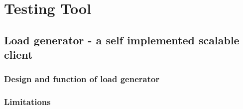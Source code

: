 \chapter{Testing Tool}
\section{Load generator - a self implemented scalable client}
\subsection{Design and function of load generator}
\subsection{Limitations}
